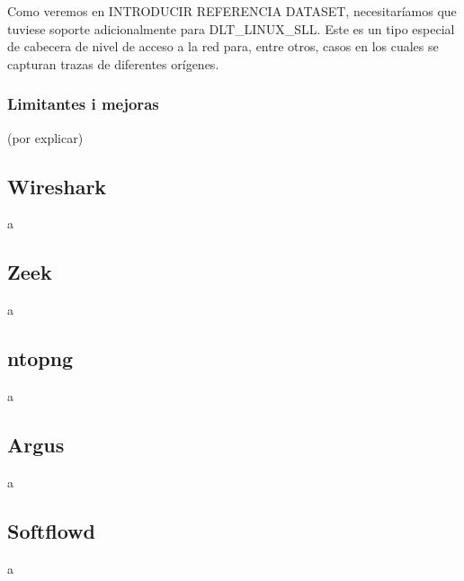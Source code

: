 Como veremos en INTRODUCIR REFERENCIA DATASET, necesitaríamos que tuviese soporte adicionalmente para DLT\_LINUX\_SLL. Este es un tipo especial de cabecera de nivel de acceso a la red para, entre otros, casos en los cuales se capturan trazas de diferentes orígenes.

\subsubsection{Limitantes i mejoras}

(por explicar)

\subsection{Wireshark}

a

\subsection{Zeek}

a

\subsection{ntopng}

a

\subsection{Argus}

a

\subsection{Softflowd}

a

